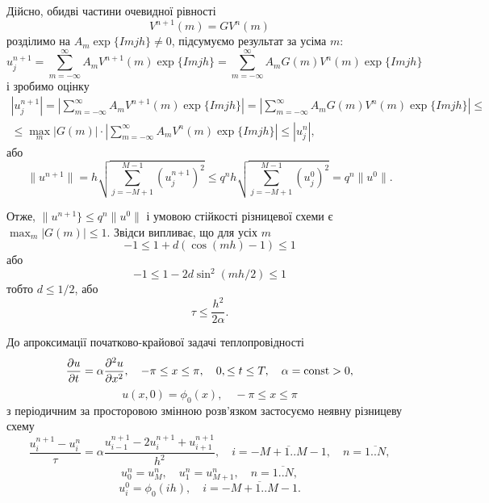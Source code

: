 Дійсно, обидві частини очевидної рівності
\begin{equation*}
    V^{n + 1}(m) = G V^n(m)
\end{equation*}
розділимо на $A_m \exp\{Imjh\} \ne 0$, підсумуємо результат за усіма $m$:
\begin{equation*}
    u_j^{n+1} = \sum_{m = -\infty}^\infty A_m V^{n+1}(m) \exp\{Imjh\} = \sum_{m=-\infty}^\infty A_mG(m)V^n(m)\exp\{Imjh\}
\end{equation*}
і зробимо оцінку
\begin{multline*}
    |u_j^{n+1}| = \left|\sum_{m = -\infty}^\infty A_m V^{n+1}(m) \exp\{Imjh\}\right| = \left|\sum_{m=-\infty}^\infty A_mG(m)V^n(m)\exp\{Imjh\}\right| \le \\ \le \max_m |G(m)|\cdot\left|\sum_{m=-\infty}^\infty A_mV^n(m)\exp\{Imjh\}\right|\leq|u_j^n|,
\end{multline*}
або
\begin{equation*}
    \|u^{n+1}\|=h\sqrt{\sum_{j=-M+1}^{M-1}(u_j^{n+1})^2} \le q^n h\sqrt{\sum_{j=-M+1}^{M-1}(u_j^0)^2} = q^n\|u^0\|.
\end{equation*}

Отже, $\|u^{n+1}\}\le q^n\|u^0\|$ і умовою стійкості різницевої схеми є $\max_m|G(m)| \le 1$. Звідси випливає, що для усіх $m$
\begin{equation*}
    -1 \le 1 + d (\cos(mh) - 1) \le 1
\end{equation*}
або  
\begin{equation*}
    -1 \le 1 - 2 d \sin^2(mh/2) \le 1
\end{equation*}
тобто $d \le 1/2$, або
\begin{equation*}
    \tau \le \frac{h^2}{2\alpha}.
\end{equation*}

\begin{example}
    До апроксимації початково-крайової задачі теплопровідності
    \begin{equation*}
        \frac{\partial u}{\partial t} = \alpha \frac{\partial^2 u}{\partial x^2}, \quad -\pi \le x \le \pi, \quad 0, \le t \le T, \quad \alpha = \operatorname{const} > 0,
    \end{equation*}
    \begin{equation*}
        u(x, 0) = \phi_0(x), \quad -\pi \le x \le \pi
    \end{equation*}
    з періодичним за просторовою змінною розв'язком застосуємо неявну різницеву схему
    \begin{equation*}
        \frac{u_i^{n + 1} - u_i^n}{\tau} = \alpha \frac{u_{i - 1}^{n + 1} - 2 u_i^{n + 1} + u_{i + 1}^{n + 1}}{h^2}, \quad i = \overline{-M+1..M-1}, \quad n = \overline{1..N},
    \end{equation*}
    \begin{equation*}
        u_0^n = u_M^n, \quad u_1^n = u_{M + 1}^n, \quad n = \overline{1..N},
    \end{equation*}
    \begin{equation*}
        u_i^0 = \phi_0(i h), \quad i = \overline{-M+1..M-1}.
    \end{equation*}
\end{example}

